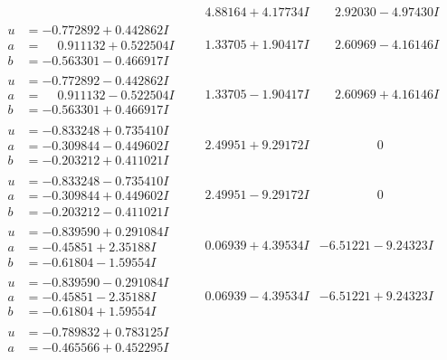 \documentclass[1p]{elsarticle_modified}
\theoremstyle{definition}
\begin{document}
$$\begin{array}{c|c|c}
 & \phantom{-}4.88164 + 4.17734 I & \phantom{-}2.92030 - 4.97430 I \\ \hline\begin{aligned}
u &= -0.772892 + 0.442862 I \\
a &= \phantom{-}0.911132 + 0.522504 I \\
b &= -0.563301 - 0.466917 I\end{aligned}
 & \phantom{-}1.33705 + 1.90417 I & \phantom{-}2.60969 - 4.16146 I \\ \hline\begin{aligned}
u &= -0.772892 - 0.442862 I \\
a &= \phantom{-}0.911132 - 0.522504 I \\
b &= -0.563301 + 0.466917 I\end{aligned}
 & \phantom{-}1.33705 - 1.90417 I & \phantom{-}2.60969 + 4.16146 I \\ \hline\begin{aligned}
u &= -0.833248 + 0.735410 I \\
a &= -0.309844 - 0.449602 I \\
b &= -0.203212 + 0.411021 I\end{aligned}
 & \phantom{-}2.49951 + 9.29172 I & \phantom{-0.000000 } 0 \\ \hline\begin{aligned}
u &= -0.833248 - 0.735410 I \\
a &= -0.309844 + 0.449602 I \\
b &= -0.203212 - 0.411021 I\end{aligned}
 & \phantom{-}2.49951 - 9.29172 I & \phantom{-0.000000 } 0 \\ \hline\begin{aligned}
u &= -0.839590 + 0.291084 I \\
a &= -0.45851 + 2.35188 I \\
b &= -0.61804 - 1.59554 I\end{aligned}
 & \phantom{-}0.06939 + 4.39534 I & -6.51221 - 9.24323 I \\ \hline\begin{aligned}
u &= -0.839590 - 0.291084 I \\
a &= -0.45851 - 2.35188 I \\
b &= -0.61804 + 1.59554 I\end{aligned}
 & \phantom{-}0.06939 - 4.39534 I & -6.51221 + 9.24323 I \\ \hline\begin{aligned}
u &= -0.789832 + 0.783125 I \\
a &= -0.465566 + 0.452295 I \\

\end{aligned}
\end{array}$$
\end{document}
